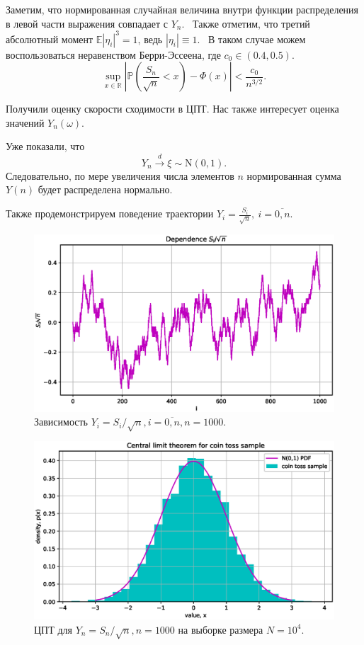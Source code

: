 \documentclass[11pt]{report}
\begin{document}
Заметим, что нормированная случайная величина внутри функции распределения в левой части выражения совпадает с $Y_n$. \
Также отметим, что третий абсолютный момент $\mathbb{E}|\eta_i|^3=1$, ведь $|\eta_i|\equiv1$. \
В таком случае можем воспользоваться неравенством Берри-Эссеена, где $c_0\in(0.4,0.5)$.
$$
\sup_{x\in\mathbb{R}}\left| \mathbb{P}\left( \dfrac{S_n}{\sqrt{n}} < x \right) - \Phi(x) \right| < \dfrac{c_0}{n^{3/2}}.
$$

Получили оценку скорости сходимости в ЦПТ.
Нас также интересует оценка значений $Y_n(\omega)$.

Уже показали, что
$$
Y_n \stackrel{d}{\to} \xi\sim\mathrm{N}(0,1).
$$
Следовательно, по мере увеличения числа элементов $n$ нормированная сумма $Y(n)$ будет распределена нормально.

Также продемонстрируем поведение траектории $Y_i = \frac{S_i}{\sqrt{n}},~ i=\overline{0,n}$.

\begin{figure}[H]
    \centering
    \includegraphics[width=0.9\linewidth]{coin-toss-dep.eps}
    \caption{Зависимость $Y_i=S_i/\sqrt{n},i=\overline{0,n}, n=1000$.}
    \label{fig:coin-toss-dep}
\end{figure}

\begin{figure}[H]
    \centering
    \includegraphics[width=0.9\linewidth]{coin-toss-clt.eps}
    \caption{ЦПТ для $Y_n=S_n/\sqrt{n}, n=1000$ на выборке размера $N=10^4$.}
    \label{fig:coin-toss-clt}
\end{figure}
\end{document}
